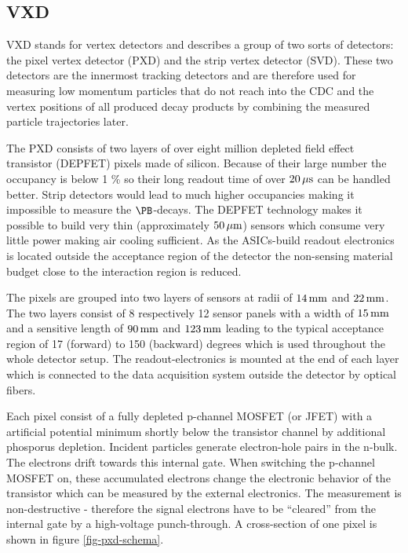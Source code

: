 \subsection{VXD}
VXD stands for vertex detectors and describes a group of two sorts of detectors: the pixel vertex detector (PXD) and the strip vertex detector (SVD). These two detectors are the innermost tracking detectors and are therefore used for measuring low momentum particles that do not reach into the CDC and the vertex positions of all produced decay products by combining the measured particle trajectories later.

The PXD consists of two layers of over eight million depleted field effect transistor (DEPFET) pixels made of silicon. Because of their large number the occupancy is below 1 \% so their long readout time of over $\unit[20]{\mu s}$ can be handled better. Strip detectors would lead to much higher occupancies making it impossible to measure the $\PB$-decays. 
The DEPFET technology makes it possible to build very thin (approximately $\unit[50]{\mu m}$) sensors which consume very little power making air cooling sufficient. As the ASICs-build readout electronics is located outside the acceptance region of the detector the non-sensing material budget close to the interaction region is reduced.

The pixels are grouped into two layers of sensors at radii of $\unit[14]{mm}$ and $\unit[22]{mm}$. The two layers consist of 8 respectively 12 sensor panels with a width of $\unit[15]{mm}$ and a sensitive length of $\unit[90]{mm}$ and $\unit[123]{mm}$ leading to the typical acceptance region of 17 (forward) to 150 (backward) degrees which is used throughout the whole detector setup. The readout-electronics is mounted at the end of each layer which is connected to the data acquisition system outside the detector by optical fibers.

Each pixel consist of a fully depleted p-channel MOSFET (or JFET) with a artificial potential minimum shortly below the transistor channel by additional phosporus depletion. Incident particles generate electron-hole pairs in the n-bulk. The electrons drift towards this internal gate. When switching the p-channel MOSFET on, these accumulated electrons change the electronic behavior of the transistor which can be measured by the external electronics. The measurement is non-destructive - therefore the signal electrons have to be ``cleared'' from the internal gate by a high-voltage punch-through. A cross-section of one pixel is shown in figure \ref{fig-pxd-schema}.


